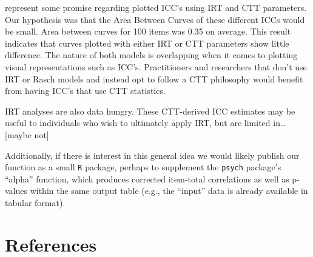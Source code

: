 \documentclass[
  man]{apa6}
\begin{document}
represent some promise regarding plotted ICC's using IRT and CTT parameters. Our hypothesis was that the Area Between Curves of these different ICCs would be small. Area between curves for 100 items was 0.35 on average. This result indicates that curves plotted with either IRT or CTT parameters show little difference. The nature of both models is overlapping when it comes to plotting visual representations such as ICC's. Practitioners and researchers that don't use IRT or Rasch models and instead opt to follow a CTT philosophy would benefit from having ICC's that use CTT statistics.

IRT analyses are also data hungry. These CTT-derived ICC estimates may be useful to individuals who wish to ultimately apply IRT, but are limited in\ldots{} {[}maybe not{]}

Additionally, if there is interest in this general idea we would likely publish our function as a small \texttt{R} package, perhaps to supplement the \texttt{psych} package's ``alpha'' function, which produces corrected item-total correlations as well as p-values within the same output table (e.g., the ``input'' data is already available in tabular format).

\newpage

\hypertarget{references}{%
\section{References}\label{references}}

\begingroup
\setlength{\parindent}{-0.5in}
\setlength{\leftskip}{0.5in}
\end{document}
